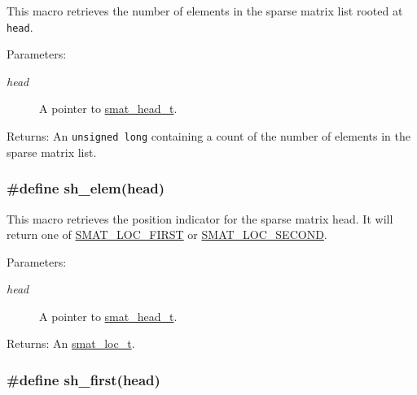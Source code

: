 This macro retrieves the number of elements in the sparse matrix list rooted at {\tt head}.

\begin{Desc}
\item[Parameters:]
\begin{description}
\item[{\em head}]A pointer to \hyperlink{group__dbprim__smat_a1}{smat\_\-head\_\-t}.\end{description}
\end{Desc}
\begin{Desc}
\item[Returns:]An {\tt unsigned long} containing a count of the number of elements in the sparse matrix list. \end{Desc}
\hypertarget{group__dbprim__smat_a30}{
\subsubsection[sh\_\-elem]{\setlength{\rightskip}{0pt plus 5cm}\#define sh\_\-elem(head)}}
\label{group__dbprim__smat_a30}


This macro retrieves the position indicator for the sparse matrix head. It will return one of \hyperlink{group__dbprim__smat_a47a135}{SMAT\_\-LOC\_\-FIRST} or \hyperlink{group__dbprim__smat_a47a136}{SMAT\_\-LOC\_\-SECOND}.

\begin{Desc}
\item[Parameters:]
\begin{description}
\item[{\em head}]A pointer to \hyperlink{group__dbprim__smat_a1}{smat\_\-head\_\-t}.\end{description}
\end{Desc}
\begin{Desc}
\item[Returns:]An \hyperlink{group__dbprim__smat_a6}{smat\_\-loc\_\-t}. \end{Desc}
\hypertarget{group__dbprim__smat_a34}{
\subsubsection[sh\_\-first]{\setlength{\rightskip}{0pt plus 5cm}\#define sh\_\-first(head)}}
\label{group__dbprim__smat_a34}


